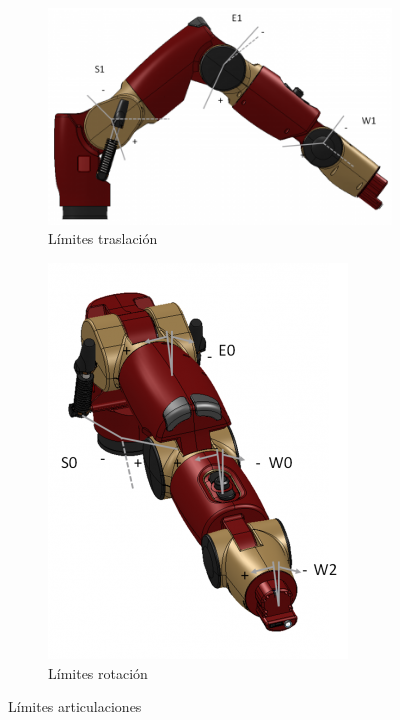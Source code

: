 \begin{figure}[]
	\centering
	\begin{subfigure}[b]{0.4\textwidth}
		\includegraphics[width=\textwidth]{imagenes/desarrollo/baxter_range_motion1.png}
		\caption{Límites traslación}
		\label{fig:desarrollo/limits1}
	\end{subfigure}
	\begin{subfigure}[b]{0.4\textwidth}
		\includegraphics[width=\textwidth]{imagenes/desarrollo/baxter_range_motion2.png}
		\caption{Límites rotación}
		\label{fig:desarrollo/limits2}
	\end{subfigure}
	\caption{Límites articulaciones}
	\label{fig:desarrollo/limits}
\end{figure}

